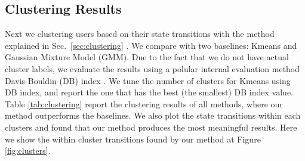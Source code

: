 %


%
\subsection{Clustering Results}
Next we clustering users based on their state transitions with the method explained in Sec.\ \ref{sec:clustering} . 
We compare with two baselines: Kmeans and Gaussian Mixture Model (GMM). 
Due to the fact that we do not have actual cluster labels, we evaluate the results using a polular
internal evaluation method Davis-Bouldin (DB) index \cite{dbindex}. 
We tune the number of clusters for Kmeans using DB index, and report the one that has the best (the smallest) DB index value. 
Table \ref{tab:clustering} report the clustering results of all methods, 
where our method outperforms the baselines. We also plot the state transitions within each clusters  
and found that our method produces the most meaningful results. Here we show the within cluster transitions found by our
method at Figure \ref{fig:clusters}.  


